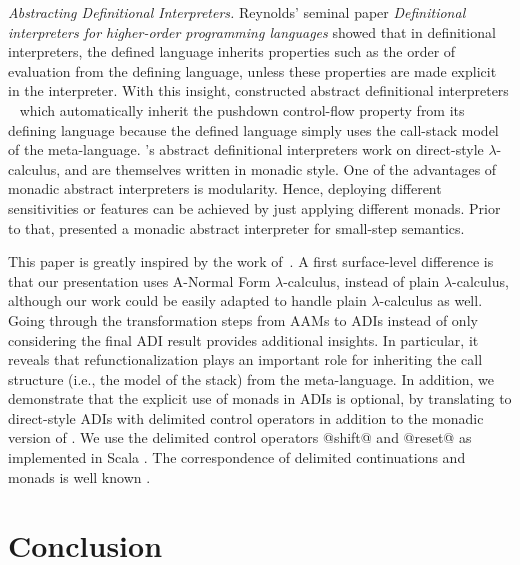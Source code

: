 \documentclass[acmsmall, screen]{acmart}\settopmatter{}
\begin{document}
\textit{Abstracting Definitional Interpreters.}
Reynolds' seminal paper \emph{Definitional interpreters for higher-order programming languages}
\cite{Reynolds:72, Reynolds:HOSC98-revisited} showed that in definitional interpreters, the
defined language inherits properties such as the order of evaluation from the defining
language, unless these properties are made explicit in the interpreter. With this insight,
\citeauthor{darais2017abstracting} constructed abstract definitional interpreters
~\cite{darais2017abstracting, darais2017thesis} which automatically inherit the pushdown 
control-flow property from its defining language because the defined language simply uses 
the call-stack model of the meta-language.
\citeauthor{darais2017abstracting}'s abstract definitional interpreters work on direct-style
$\lambda$-calculus, and are themselves written in monadic style. One of the advantages of monadic
abstract interpreters is modularity. Hence, deploying different sensitivities
or features can be achieved by just applying different monads. Prior to that, \citet{Sergey:2013:MAI:2491956.2491979}
presented a monadic abstract interpreter for small-step semantics.

This paper is greatly inspired by the work of~\citet{darais2017abstracting}.
A first surface-level difference is that our presentation uses A-Normal Form $\lambda$-calculus,
instead of plain $\lambda$-calculus, although our work could be easily adapted to handle plain
$\lambda$-calculus as well. Going through the transformation steps from AAMs to ADIs instead of
only considering the final ADI result provides additional insights. In particular, it reveals that
refunctionalization plays an important role for inheriting the call structure (i.e., the model of
the stack) from the meta-language.
In addition, we demonstrate that the explicit use of monads in ADIs is optional, by translating to
direct-style ADIs with delimited control operators in addition to the monadic version of \citet{darais2017abstracting}.
We use the delimited control operators @shift@ and @reset@ \cite{Danvy:1990:AC:91556.91622} as implemented in Scala
\cite{rompf2009implementing}. The correspondence of delimited continuations and monads is well known
\cite{Danvy:1990:AC:91556.91622, wadler1992essence, danvy1992representing, moggi1991notions, filinski1994representing}.

\section{Conclusion}\label{sec:conclusion}
\end{document}
